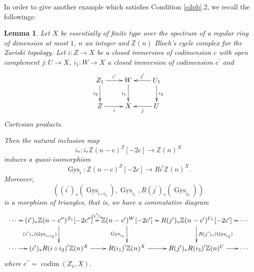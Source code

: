 \documentclass{article}
\newtheorem{lem}[thm]{\indent \sc Lemma}
\begin{document}
In order to give another example which satisfies
Condition \ref{cdpb}.2, 
we recall the followings:


%
\begin{lem}\upshape\label{Gyscom}
Let $X$ be essentially of finite type over the spectrum of a regular ring of
dimension at most $1$,
$n$ an integer
and
$\mathbb{Z}(n)$ Bloch's cycle complex for the Zariski topology.   
Let $i: Z\to X$ be a closed immersion of codimension $c$
with open complement $j: U\to X$,
$i_{1}: W\to X$
a closed immersion of codimension $c^{\prime}$
and
%
\begin{equation*}
\xymatrix{
Z_{1}\ar[r]^{i^{\prime}}\ar[d]_{i_{2}}
&
W\ar[d]_{i_{1}}
&
U_{1}\ar[l]_{j^{\prime}}\ar[d]^{i_{3}}
\\
Z\ar[r]_{i}
&
X
&
U \ar[l]^{j}
}    
\end{equation*}
%
Cartesian products.

Then the natural inclusion map
%
\begin{equation*}
i_{*}: i_{*}\mathbb{Z}(n-c)^{Z}[-2c]
\to 
\mathbb{Z}(n)^{X}
\end{equation*}
%
induces a quasi-isomorphism
%
\begin{equation*}
\operatorname{Gys}_{i}: 
\mathbb{Z}(n-c)^{Z}[-2c]
\to
Ri^{!}\mathbb{Z}(n)^{X}.
\end{equation*}
%
Moreover,
%
\begin{equation*}
\left(
(i^{\prime})_{*}(\operatorname{Gys}_{i\circ i_{2}}),
\operatorname{Gys}_{i_{1}},
R(j^{\prime})_{*}(\operatorname{Gys}_{i_{3}})
\right)
\end{equation*}
%
is a morphism of triangles,
that is,
we have a commutative diagram
%
\begin{equation*}
\xymatrix@C=6pt{
\cdots\ar[r]
&
(i^{\prime})_{*}\mathbb{Z}(n-c^{\prime\prime})^{Z_{1}}[-2c^{\prime\prime}]
\ar[r]^-{(i^{\prime})_{*}}
\ar[d]_{(i^{\prime})_{*}(\operatorname{Gys}_{i\circ i_{2}})}
&
\mathbb{Z}(n-c^{\prime})^{W}[-2c^{\prime}]
\ar[r]
\ar[d]_{\operatorname{Gys}_{i_{1}}}
&
R(j^{\prime})_{*}\mathbb{Z}(n-c^{\prime})^{U_{1}}[-2c^{\prime}]\ar[r]
\ar[d]^{R(j^{\prime})_{*}(\operatorname{Gys}_{i_{3}})}
& \cdots
\\
\cdots\ar[r]
&
(i^{\prime})_{*}R(i\circ i_{2})^{!}\mathbb{Z}(n)^{X}
\ar[r]
&
R(i_{1})^{!}\mathbb{Z}(n)^{X}
\ar[r]
&
R(j^{\prime})_{*}R(i_{3})^{!}\mathbb{Z}(n)^{U}
\ar[r]
&
\cdots
}    
\end{equation*}
%
where $c^{\prime\prime}=\operatorname{codim}(Z_{1}, X)$.
\end{lem}
%
\end{document}
